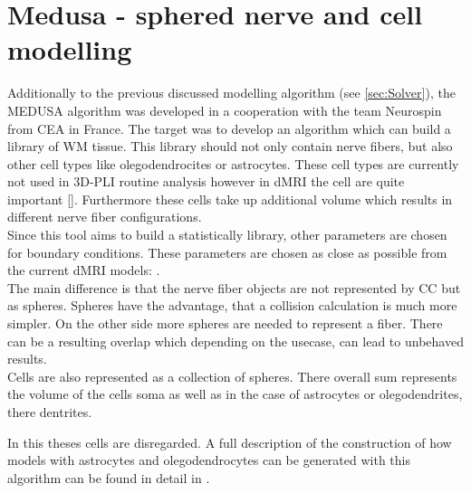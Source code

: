 \section{Medusa - sphered nerve and cell modelling}
\label{sec:medusa}
% 
% 
Additionally to the previous discussed modelling algorithm (see \cref{sec:Solver}), the \ac{MEDUSA} algorithm \cite{Ginsburger2019} was developed in a cooperation with the team Neurospin from \ac{CEA} in France.
The target was to develop an algorithm which can build a library of \ac{WM} tissue.
This library should not only contain nerve fibers, but also other cell types like olegodendrocites or astrocytes.
These cell types are currently not used in \ac{3D-PLI} routine analysis however in \ac{dMRI} the cell are quite important [\dummy{}].
Furthermore these cells take up additional volume which results in different nerve fiber configurations.
\\
% 
Since this tool aims to build a statistically library, other parameters are chosen for boundary conditions.
These parameters are chosen as close as possible from the current \ac{dMRI} models:
\dummy{}.
\\
%
The main difference is that the nerve fiber objects are not represented by \ac{CC} but as spheres.
Spheres have the advantage, that a collision calculation is much more simpler. 
On the other side more spheres are needed to represent a fiber.
There can be a resulting overlap which depending on the usecase, can lead to unbehaved results.
\\
% 
Cells are also represented as a collection of spheres.
There overall sum represents the volume of the cells soma as well as in the case of astrocytes or olegodendrites, there dentrites.
\par
%
In this theses cells are disregarded.
A full description of the construction of how models with astrocytes and olegodendrocytes can be generated with this algorithm can be found in detail in  \cite{Ginsburger2019}.
% 
